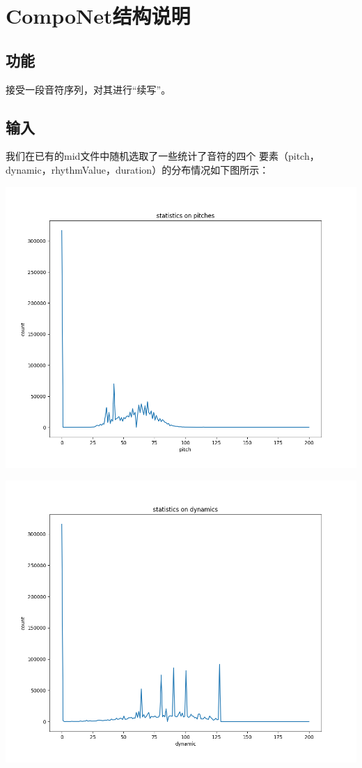 \documentclass{article}
\begin{document}
  \section{CompoNet结构说明}
  \subsection{功能}
    接受一段音符序列，对其进行“续写”。
  \subsection{输入}
    我们在已有的mid文件中随机选取了一些统计了音符的四个
    要素（pitch，dynamic，rhythmValue，duration）的分布情况如下图所示：
    
    \includegraphics[width=.9\textwidth]{picture/pitches.png}
      
    \includegraphics[width=.9\textwidth]{picture/dynamics.png}
\end{document}
